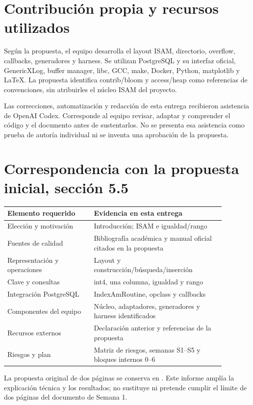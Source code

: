 \documentclass[11pt,a4paper]{article}
\newcommand{\code}[1]{\texttt{\detokenize{#1}}}
\begin{document}
\section*{Contribución propia y recursos utilizados}
Según la propuesta, el equipo desarrolla el layout ISAM, directorio, overflow,
callbacks, generadores y harness. Se utilizan PostgreSQL y su interfaz oficial,
GenericXLog, buffer manager, libc, GCC, make, Docker, Python, matplotlib y LaTeX.
La propuesta identifica contrib/bloom y access/heap como referencias de
convenciones, sin atribuirles el núcleo ISAM del proyecto.

Las correcciones, automatización y redacción de esta entrega recibieron asistencia
de OpenAI Codex. Corresponde al equipo revisar, adaptar y comprender el código y
el documento antes de sustentarlos. No se presenta esa asistencia como prueba
de autoría individual ni se inventa una aprobación de la propuesta.

\appendix
\section{Correspondencia con la propuesta inicial, sección 5.5}
\begin{longtable}{p{0.35\linewidth}p{0.53\linewidth}}
\toprule Elemento requerido & Evidencia en esta entrega\\\midrule
Elección y motivación & Introducción; ISAM e igualdad/rango\\
Fuentes de calidad & Bibliografía académica y manual oficial citados en la propuesta\\
Representación y operaciones & Layout y construcción/búsqueda/inserción\\
Clave y consultas & int4, una columna, igualdad y rango\\
Integración PostgreSQL & IndexAmRoutine, opclass y callbacks\\
Componentes del equipo & Núcleo, adaptadores, generadores y harness identificados\\
Recursos externos & Declaración anterior y referencias de la propuesta\\
Riesgos y plan & Matriz de riesgos, semanas S1--S5 y bloques internos 0--6\\\bottomrule
\end{longtable}
La propuesta original de dos páginas se conserva en \code{docs/propuesta-inicial.pdf}.
Este informe amplía la explicación técnica y los resultados; no sustituye ni
pretende cumplir el límite de dos páginas del documento de Semana 1.
\end{document}
